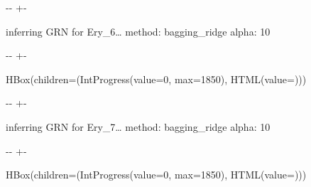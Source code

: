 \documentclass[letterpaper,10pt,english]{sphinxmanual}
\newlength\nbsphinxcodecellspacing
\begin{document}
%
{
\kern-\sphinxverbatimsmallskipamount\kern-\baselineskip
\kern+\FrameHeightAdjust\kern-\fboxrule
\vspace{\nbsphinxcodecellspacing}
%
\begin{sphinxVerbatim}[commandchars=\\\{\}]

inferring GRN for Ery\_6{\ldots}
method: bagging\_ridge
alpha: 10
\end{sphinxVerbatim}
}
\relax

{

\kern-\sphinxverbatimsmallskipamount\kern-\baselineskip
\kern+\FrameHeightAdjust\kern-\fboxrule
\vspace{\nbsphinxcodecellspacing}

%
\begin{sphinxVerbatim}[commandchars=\\\{\}]
HBox(children=(IntProgress(value=0, max=1850), HTML(value=\PYGZsq{}\PYGZsq{})))
\end{sphinxVerbatim}
}



%
{
\kern-\sphinxverbatimsmallskipamount\kern-\baselineskip
\kern+\FrameHeightAdjust\kern-\fboxrule
\vspace{\nbsphinxcodecellspacing}
%
\begin{sphinxVerbatim}[commandchars=\\\{\}]

inferring GRN for Ery\_7{\ldots}
method: bagging\_ridge
alpha: 10
\end{sphinxVerbatim}
}
\relax

{

\kern-\sphinxverbatimsmallskipamount\kern-\baselineskip
\kern+\FrameHeightAdjust\kern-\fboxrule
\vspace{\nbsphinxcodecellspacing}

%
\begin{sphinxVerbatim}[commandchars=\\\{\}]
HBox(children=(IntProgress(value=0, max=1850), HTML(value=\PYGZsq{}\PYGZsq{})))
\end{sphinxVerbatim}
}
\end{document}

